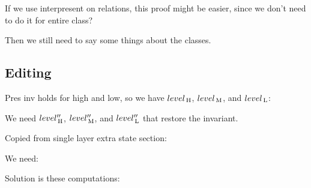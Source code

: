 If we use interpresent on relations, this proof might be easier, since we don't need to do it for entire class? 

Then we still need to say some things about the classes.

\subsection{Editing}

Pres inv holds for high and low, so we have $level_{\, \mathrm H}$, $level_{\, \mathrm M}$, and $level_{\, \mathrm L}$:




We need $level''_{\, \mathrm H}$,  $level''_{\, \mathrm M}$, and $level''_{\, \mathrm L}$ that restore the invariant.

Copied from single layer extra state section:

We need:



Solution is these computations:



